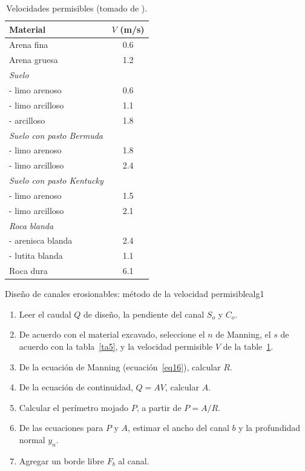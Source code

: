 \documentclass[11pt, oneside]{article}
\begin{document}
\begin{table}[h!]
\centering
\begin{tabular}{l c}
 \hline
  Material & $V$ (m/s) \\ [0.5ex]
 \hline\hline
 Arena fina & 0.6 \\
 Arena gruesa & 1.2 \\
\emph{Suelo} & \\
- limo arenoso & 0.6 \\
- limo arcilloso & 1.1 \\
- arcilloso & 1.8 \\
\emph{Suelo con pasto Bermuda} & \\
- limo arenoso & 1.8 \\
- limo arcilloso & 2.4 \\
\emph{Suelo con pasto Kentucky} & \\
- limo arenoso & 1.5 \\
- limo arcilloso & 2.1 \\
\emph{Roca blanda} & \\
- arenisca blanda & 2.4 \\
- lutita blanda & 1.1 \\
Roca dura  & 6.1 \\
\hline
\end{tabular}
\caption{Velocidades permisibles (tomado de \cite{Chau}).}
\label{ta6}
\end{table}

\begin{alg}{Diseño de canales erosionables: m\'etodo de la velocidad permisible}{alg1}
\begin{enumerate}
\item Leer el caudal $Q$ de diseño, la pendiente del canal $S_o$ y $C_o$.
\item \label{st2} De acuerdo con el material excavado, seleccione el $n$ de Manning, el $s$ de acuerdo con la tabla~\ref{ta5}, y la velocidad permisible $V$ de la table~\ref{ta6}.
\item De la ecuaci\'on de Manning (ecuaci\'on~\ref{eq16}), calcular $R$.
\item De la ecuaci\'on de continuidad, $Q=AV$, calcular $A$.
\item Calcular el per\'imetro mojado $P$, a partir de $P=A/R$.
\item De las ecuaciones para $P$ y $A$, estimar el ancho del canal $b$ y la profundidad normal $y_n$.
\item \label{st5} Agregar un borde libre $F_b$ al canal.
\end{enumerate}
\end{alg}
\end{document}
